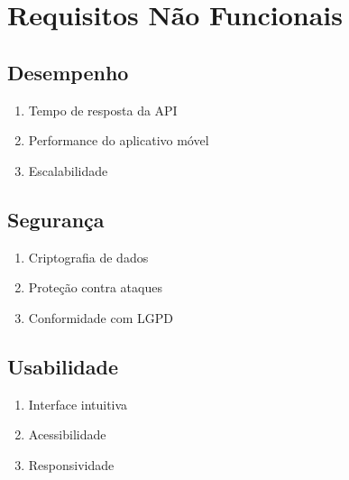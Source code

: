 \section{Requisitos Não Funcionais}
\subsection{Desempenho}
\begin{enumerate}[label=RNF-P.\arabic*]
    \item Tempo de resposta da API
    \item Performance do aplicativo móvel
    \item Escalabilidade
\end{enumerate}

\subsection{Segurança}
\begin{enumerate}[label=RNF-S.\arabic*]
    \item Criptografia de dados
    \item Proteção contra ataques
    \item Conformidade com LGPD
\end{enumerate}

\subsection{Usabilidade}
\begin{enumerate}[label=RNF-U.\arabic*]
    \item Interface intuitiva
    \item Acessibilidade
    \item Responsividade
\end{enumerate} 